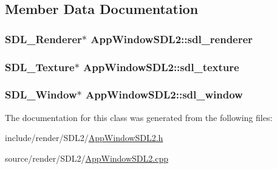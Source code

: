 \subsection{Member Data Documentation}
\hypertarget{classAppWindowSDL2_a539103b261c406ef7d4ef978b79fa56c}{
\subsubsection[{sdl\-\_\-renderer}]{\setlength{\rightskip}{0pt plus 5cm}S\-D\-L\-\_\-\-Renderer$\ast$ App\-Window\-S\-D\-L2\-::sdl\-\_\-renderer}}\label{classAppWindowSDL2_a539103b261c406ef7d4ef978b79fa56c}
\hypertarget{classAppWindowSDL2_af7cc56a6049e4b78386e3e7e5e047e9e}{
\subsubsection[{sdl\-\_\-texture}]{\setlength{\rightskip}{0pt plus 5cm}S\-D\-L\-\_\-\-Texture$\ast$ App\-Window\-S\-D\-L2\-::sdl\-\_\-texture}}\label{classAppWindowSDL2_af7cc56a6049e4b78386e3e7e5e047e9e}
\hypertarget{classAppWindowSDL2_a47f7d1f174e4b7b96d99a96bd5916a3d}{
\subsubsection[{sdl\-\_\-window}]{\setlength{\rightskip}{0pt plus 5cm}S\-D\-L\-\_\-\-Window$\ast$ App\-Window\-S\-D\-L2\-::sdl\-\_\-window}}\label{classAppWindowSDL2_a47f7d1f174e4b7b96d99a96bd5916a3d}


The documentation for this class was generated from the following files\-:\begin{DoxyCompactItemize}
\item 
include/render/\-S\-D\-L2/\hyperlink{AppWindowSDL2_8h}{App\-Window\-S\-D\-L2.\-h}\item 
source/render/\-S\-D\-L2/\hyperlink{AppWindowSDL2_8cpp}{App\-Window\-S\-D\-L2.\-cpp}\end{DoxyCompactItemize}

